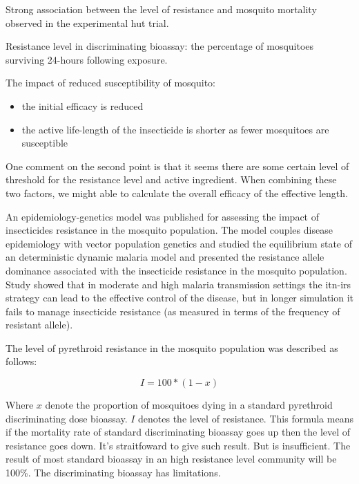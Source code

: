 \documentclass[a4paper, 12pt, twoside]{article}
\begin{document}
Strong association between the level of resistance and mosquito mortality observed in the experimental hut trial\cite{Sherrard-Smith2018b}.

Resistance level in discriminating bioassay: the percentage of mosquitoes surviving 24-hours following exposure.

The impact of reduced susceptibility of mosquito:
\begin{itemize}
	\item the initial efficacy is reduced
	\item the active life-length of the insecticide is shorter as fewer mosquitoes are susceptible
\end{itemize}


One comment on the second point is that it seems there are some certain level of threshold for the resistance level and active ingredient. When combining these two factors, we might able to calculate the overall efficacy of the effective length.

An epidemiology-genetics model was published\cite{Mohammed-Awel2019} for assessing the impact of insecticides resistance in the mosquito population.
The model couples disease epidemiology with vector population genetics and studied the equilibrium state of an deterministic dynamic malaria model and presented the resistance allele dominance associated with the insecticide resistance in the mosquito population.
Study showed that in moderate and high malaria transmission settings the \gls{itn}-\gls{irs} strategy can lead to the effective control of the disease, but in longer simulation it fails to manage insecticide resistance (as measured in terms of the frequency of resistant allele).

The level of pyrethroid resistance in the mosquito population was described as follows:

$$I = 100 * ( 1 - x )$$

Where $x$ denote the proportion of mosquitoes dying in a standard pyrethroid discriminating dose bioassay.
$I$ denotes the level of resistance.
This formula means if the mortality rate of standard discriminating bioassay goes up then the level of resistance goes down.
It's straitfoward to give such result.
But is insufficient.
The result of most standard bioassay in an high resistance level community will be 100\%.
The discriminating bioassay has limitations.
\end{document}
